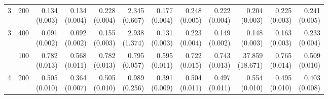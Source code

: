 \begin{table}[p]
{\begin{tabular}{llrrrrrrrrrr}
3 & 200 & \shortstack{0.134\\(0.003)} & \shortstack{0.134\\(0.004)} & \shortstack{0.228\\(0.004)} & \shortstack{2.345\\(0.667)} & \shortstack{0.177\\(0.004)} & \shortstack{0.248\\(0.005)} & \shortstack{0.222\\(0.004)} & \shortstack{0.204\\(0.003)} & \shortstack{0.225\\(0.003)} & \shortstack{0.241\\(0.005)} \\
3 & 400 & \shortstack{0.091\\(0.002)} & \shortstack{0.092\\(0.002)} & \shortstack{0.155\\(0.003)} & \shortstack{2.938\\(1.374)} & \shortstack{0.131\\(0.003)} & \shortstack{0.223\\(0.004)} & \shortstack{0.149\\(0.002)} & \shortstack{0.148\\(0.003)} & \shortstack{0.163\\(0.003)} & \shortstack{0.233\\(0.004)} \\
\addlinespace
4 & 100 & \shortstack{0.782\\(0.013)} & \shortstack{0.568\\(0.011)} & \shortstack{0.782\\(0.013)} & \shortstack{0.795\\(0.057)} & \shortstack{0.595\\(0.011)} & \shortstack{0.722\\(0.015)} & \shortstack{0.743\\(0.013)} & \shortstack{37.859\\(18.671)} & \shortstack{0.765\\(0.014)} & \shortstack{0.509\\(0.010)} \\
4 & 200 & \shortstack{0.505\\(0.010)} & \shortstack{0.364\\(0.007)} & \shortstack{0.505\\(0.010)} & \shortstack{0.989\\(0.256)} & \shortstack{0.391\\(0.009)} & \shortstack{0.504\\(0.011)} & \shortstack{0.497\\(0.011)} & \shortstack{0.554\\(0.010)} & \shortstack{0.495\\(0.010)} & \shortstack{0.403\\(0.008)} \\

\end{tabular}}
\end{table}

